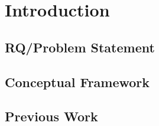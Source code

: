 \newpage
\section{Introduction}
\subsection{RQ/Problem Statement}
\subsection{Conceptual Framework}
\subsection{Previous Work}